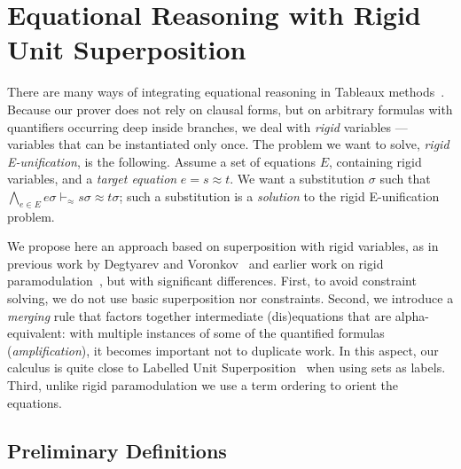 
\section{Equational Reasoning with Rigid Unit Superposition}

\EnableBpAbbreviations{}

\newcommand\clauseWithSubst[2]{\ensuremath{#1 ~|~ #2}}
\newcommand\renameVarsSymb{\ensuremath{\textsf{rename}}}
\newcommand\renameVars[1]{\ensuremath{\renameVarsSymb}(#1)}
\newcommand\mapVar[2]{\ensuremath{#2/#1}}

There are many ways of integrating equational reasoning in
Tableaux methods~\cite{brand1975proving,letz2002integration,backeman2015theorem,degtyarev1996you}.
Because our prover does not rely on clausal forms, but on arbitrary formulas
with quantifiers occurring deep inside branches,
we deal with {\em rigid} variables --- variables that can be instantiated
only once.
The problem we want to solve, {\em rigid E-unification}, is the following.
Assume a set of equations $E$, containing rigid variables,
and a {\em target equation} $e = s \approx t$.
We want a substitution $\sigma$ such that
$\bigwedge_{e \in E} e\sigma \vdash_\approx s\sigma \approx t\sigma$;
such a substitution is a {\em solution} to the rigid E-unification problem.

We propose here an approach based on superposition with rigid variables,
as in previous work by Degtyarev and Voronkov~\cite{degtyarev1996you}
and earlier work on rigid paramodulation~\cite{plaisted1995special},
but with significant differences.
First, to avoid constraint solving, we do not use
basic superposition nor constraints.
Second, we introduce a {\em merging} rule that factors together
intermediate (dis)equations that are alpha-equivalent:
with multiple instances of some of the quantified formulas ({\em amplification}),
it becomes important not to duplicate work.
In this aspect, our calculus is quite close to Labelled
Unit Superposition~\cite{iprover_eq_labelled_unit_sup} when using sets as labels.
Third, unlike rigid paramodulation we use a term ordering to orient the
equations.

\subsection{Preliminary Definitions}



